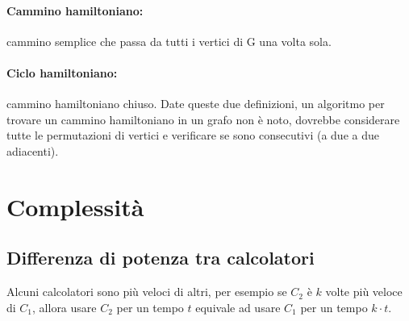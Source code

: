 \documentclass[a4paper,12pt]{article}
\let\oldsection\section
\renewcommand{\section}{\clearpage\oldsection}
\begin{document}
\paragraph{Cammino hamiltoniano:} cammino semplice che passa da tutti i vertici di G una volta sola.
\paragraph{Ciclo hamiltoniano:} cammino hamiltoniano chiuso.
Date queste due definizioni, un algoritmo per trovare un cammino hamiltoniano in un grafo non è noto, dovrebbe considerare tutte le permutazioni di vertici e verificare se sono consecutivi (a due a due adiacenti).

\section{Complessità}
\subsection{Differenza di potenza tra calcolatori}
Alcuni calcolatori sono più veloci di altri, per esempio se $C_2$ è $k$ volte più veloce di $C_1$, allora usare $C_2$ per un tempo $t$ equivale ad usare $C_1$ per un tempo $k \cdot t$.
\end{document}

